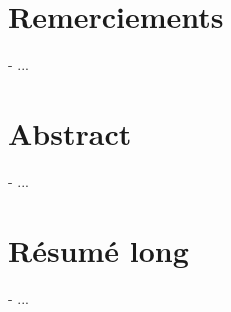 \clearpage
\pagebreak

\section*{Remerciements}
- ...

\clearpage
\pagebreak

\section*{Abstract}
- ...

\section*{Résumé long}
- ...

